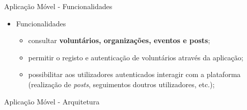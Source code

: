 \begin{frame}{Aplicação Móvel - Funcionalidades}

\vspace*{-3em}

\begin{itemize}
	\item Funcionalidades
	\begin{itemize}
		\item consultar \textbf{voluntários, organizações, eventos e posts};
		\item permitir o registo e autenticação de voluntários através da aplicação;
		\item possibilitar aos utilizadores autenticados interagir com a plataforma (realização de \textit{posts}, seguimentos doutros utilizadores, etc.);
	\end{itemize}
\end{itemize}

\end{frame}

\begin{frame}{Aplicação Móvel - Arquitetura}

\centering
{}\\

\end{frame}
